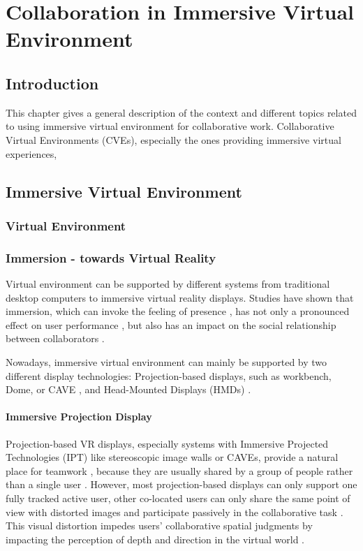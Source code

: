 \chapter{Collaboration in Immersive Virtual Environment}
\label{chapter:context}
\minitoc

\section{Introduction}
This chapter gives a general description of the context and different topics related to using immersive virtual environment for collaborative work. Collaborative Virtual Environments (CVEs), especially the ones providing immersive virtual experiences, 

\section{Immersive Virtual Environment}
\subsection{Virtual Environment}
\subsection{Immersion - towards Virtual Reality}
Virtual environment can be supported by different systems from traditional desktop computers to immersive virtual reality displays. Studies have shown that immersion, which can invoke the feeling of presence \citep{Slater1994DepthPre}, has not only a pronounced effect on user performance \citep{Dangelo2008Benefits}, but also has an impact on the social relationship between collaborators \citep{Slater2000Small}.

Nowadays, immersive virtual environment can mainly be supported by two different display technologies: Projection-based displays, such as workbench, Dome, or CAVE \citep{CruzNeira1993SPV}, and Head-Mounted Displays (HMDs) \citep{Melzer1997HMD}.

\subsubsection{Immersive Projection Display}
Projection-based VR displays, especially systems with Immersive Projected Technologies (IPT) like stereoscopic image walls or CAVEs, provide a natural place for teamwork \citep{Johanson2002IWP}, because they are usually shared by a group of people rather than a single user \citep{Benford1996SST}. However, most projection-based displays can only support one fully tracked active user, other co-located users can only share the same point of view with distorted images and participate passively in the collaborative task \citep{Bayon2006Multiple}. This visual distortion impedes users’ collaborative spatial judgments by impacting the perception of depth and direction in the virtual world \citep{Pollock2012Right}.

